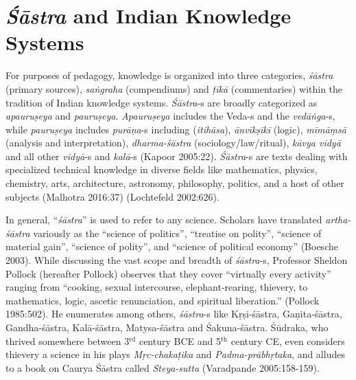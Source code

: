\section*{{\sl\bfseries Śāstra} and Indian Knowledge Systems}

For purposes of pedagogy, knowledge is organized into three categories, {\sl śāstra} (primary sources), {\sl saṅgraha} (compendiums) and {\sl ṭīkā} (commentaries) within the tradition of Indian knowledge systems. {\sl Śāstra}-s are broadly categorized as {\sl apauruṣeya} and {\sl pauruṣeya}. {\sl Apauruṣeya} includes the Veda-s and the {\sl vedāṅga}-s, while {\sl pauruṣeya} includes {\sl purāṇa}-s including ({\sl itihāsa}), {\sl ānvīkṣīkī} (logic), {\sl mīmāṃsā} (analysis and interpretation), {\sl dharma-śāstra} (sociology/law/ritual), {\sl kāvya vidyā} and all other {\sl vidyā}-s and {\sl kalā}-s (Kapoor 2005:22). {\sl Śāstra}-s are texts dealing with specialized technical knowledge in diverse fields like mathematics, physics, chemistry, arts, architecture, astronomy, philosophy, politics, and a host of other subjects (Malhotra 2016:37) (Lochtefeld 2002:626). 

In general, ``{\sl śāstra}'' is used to refer to any science. Scholars have translated {\sl artha-śāstra} variously as the ``science of politics'', ``treatise on polity'', ``science of material gain'', ``science of polity'', and ``science of political economy'' (Boesche 2003). While discussing the vast scope and breadth of {\sl śāstra}-s, Professor Sheldon Pollock (hereafter Pollock) observes that they cover ``virtually every activity'' ranging from ``cooking, sexual intercourse, elephant-rearing, thievery, to mathematics, logic, ascetic renunciation, and spiritual liberation.'' (Pollock 1985:502). He enumerates among others, {\sl śāstra}-s like Kṛṣi-śāstra, Gaṇita-śāstra, Gandha-śāstra, Kalā-śāstra, Matysa-śāstra and Śakuna-śāstra. Śūdraka, who thrived somewhere between 3$^{\text{rd}}$ century BCE and 5$^{\text{th}}$ century CE, even considers thievery a science in his plays {\sl Mṛc-chakaṭika} and {\sl Padma-prābhṛtaka},  and alludes to a book on Caurya Śāstra called {\sl Steya-sutta} (Varadpande 2005:158-159).

